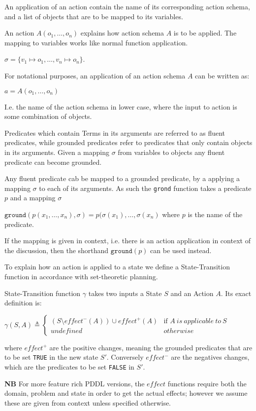 \documentclass[../Master.tex]{subfiles}
\begin{document}
	

An application of an action contain the name of its corresponding action schema, and a list of objects that are to be mapped to its variables.
\begin{definition} 
	An action $A(o_1,\dots,o_n)$ explains how action schema $A$ is to be applied. The mapping to variables works like normal function application. 
	
	$\sigma = \{ v_1 \mapsto o_1,\dots,v_n \mapsto o_n \}$.
	
	For notational purposes, an application of an action schema $A$ can be written as:
	
	$a = A(o_1,\dots,o_n)$ 
	
	I.e. the name of the action schema in lower case, where the input to action is some combination of objects.
	
	
	
\end{definition}


Predicates which contain Terms in its arguments are referred to as fluent predicates, while grounded predicates refer to predicates that only contain objects in its arguments. Given a mapping $\sigma$ from variables to objects any fluent predicate can become grounded.
\begin{definition} 
	Any fluent predicate cab be mapped to a grounded predicate, by a applying a mapping $\sigma$ to each of its arguments. As such the \texttt{grond} function takes a predicate $p$ and a mapping $\sigma$
	
		$\texttt{ground}(p(x_1,\dots,x_n),\sigma) = p(\sigma(x_1),\dots,\sigma(x_n)$ where $p$ is the name of the predicate.
		
	If the mapping is given in context, i.e. there is an action application in context of the discussion, then the shorthand $\texttt{ground}(p)$ can be used instead.
\end{definition}


To explain how an action is applied to a state we define a State-Transition function in accordance with set-theoretic planning.


\begin{definition} 
	State-Transition function $\gamma$ takes two inputs a State $S$ and an Action $A$. Its exact definition is:

	$\gamma(S,A) \triangleq 
	\left\{
	\begin{array}{ll}
		(S \setminus effect^-(A)) \cup effect^+(A) & \mbox{if } A~is~applicable~to~S  \\		
		undefined & otherwise 
	\end{array}
	\right.$ 
	
	where $effect^+$ are the positive changes, meaning the grounded predicates that are to be set \texttt{TRUE} in the new state $S'$. Conversely $effect^-$ are the negatives changes, which are the predicates to be set \texttt{FALSE} in $S'$. 
	
	\textbf{NB} For more feature rich PDDL versions, the $effect$ functions require both the domain, problem and state in order to get the actual effects; however we assume these are given from context unless specified otherwise.
	
\end{definition}
\end{document}
